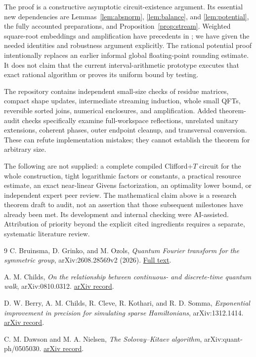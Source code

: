 \documentclass[11pt]{article}
\theoremstyle{definition}
\begin{document}
The proof is a constructive asymptotic circuit-existence argument. Its
essential new dependencies are Lemmas~\ref{lem:absnorm},
\ref{lem:balance}, and \ref{lem:potential}, the fully accounted
preparations, and Proposition~\ref{prop:stream}. Weighted square-root
embeddings and amplification have precedents in \cite{Childs,Berry};
we have given the needed identities and robustness argument explicitly.
The rational potential proof intentionally replaces an earlier informal
global floating-point rounding estimate. It does not claim that the
current interval-arithmetic prototype executes that exact rational
algorithm or proves its uniform bound by testing.

The repository contains independent small-size checks of residue matrices,
compact shape updates, intermediate streaming induction, whole small QFTs,
reversible sorted joins, numerical enclosures, and amplification. Added
theorem-audit checks specifically examine full-workspace reflections,
unrelated unitary extensions, coherent phases, outer endpoint cleanup,
and transversal conversion. These can refute implementation mistakes;
they cannot establish the theorem for arbitrary size.

The following are not supplied: a complete compiled Clifford+$T$ circuit
for the whole construction, tight logarithmic factors or constants, a
practical resource estimate, an exact near-linear Givens factorization,
an optimality lower bound, or independent expert peer review. The
mathematical claim above is a research theorem draft to audit, not an
assertion that those subsequent milestones have already been met.
Its development and internal checking were AI-assisted. Attribution of
priority beyond the explicit cited ingredients requires a separate,
systematic literature review.

\begin{thebibliography}{9}
C. Bruinsma, D. Grinko, and M. Ozols,
\emph{Quantum Fourier transform for the symmetric group},
arXiv:2608.28569v2 (2026).
\href{https://arxiv.org/html/2608.28569v2}{Full text}.

A. M. Childs,
\emph{On the relationship between continuous- and discrete-time quantum walk},
arXiv:0810.0312.
\href{https://arxiv.org/abs/0810.0312}{arXiv record}.

D. W. Berry, A. M. Childs, R. Cleve, R. Kothari, and R. D. Somma,
\emph{Exponential improvement in precision for simulating sparse Hamiltonians},
arXiv:1312.1414.
\href{https://arxiv.org/abs/1312.1414}{arXiv record}.

C. M. Dawson and M. A. Nielsen,
\emph{The Solovay--Kitaev algorithm}, arXiv:quant-ph/0505030.
\href{https://arxiv.org/abs/quant-ph/0505030}{arXiv record}.
\end{thebibliography}
\end{document}
